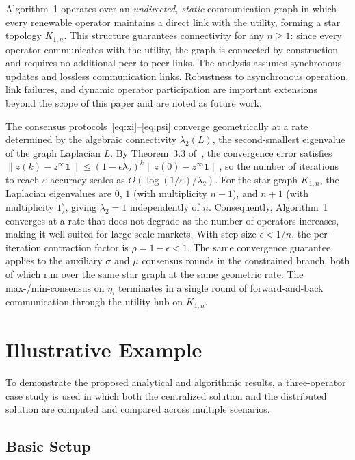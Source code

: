 \documentclass[conference]{IEEEtran}
\newcommand{\one}{\mathbf{1}}
\begin{document}
Algorithm~1 operates over an \emph{undirected, static} communication graph in which every renewable operator maintains a direct link with the utility, forming a star topology $K_{1,n}$. This structure guarantees connectivity for any $n \geq 1$: since every operator communicates with the utility, the graph is connected by construction and requires no additional peer-to-peer links. The analysis assumes synchronous updates and lossless communication links. Robustness to asynchronous operation, link failures, and dynamic operator participation are important extensions beyond the scope of this paper and are noted as future work.

The consensus protocols~\eqref{eq:xi}--\eqref{eq:psi} converge geometrically at a rate determined by the algebraic connectivity $\lambda_2(L)$, the second-smallest eigenvalue of the graph Laplacian $L$. By Theorem~3.3 of~\cite{qu}, the convergence error satisfies $\|z(k) - z^\infty\one\| \leq (1-\epsilon\lambda_2)^k \|z(0) - z^\infty\one\|$, so the number of iterations to reach $\varepsilon$-accuracy scales as $O\!\left(\log(1/\varepsilon)/\lambda_2\right)$. For the star graph $K_{1,n}$, the Laplacian eigenvalues are $0$, $1$ (with multiplicity $n-1$), and $n+1$ (with multiplicity $1$), giving $\lambda_2 = 1$ independently of $n$. Consequently, Algorithm~1 converges at a rate that does not degrade as the number of operators increases, making it well-suited for large-scale markets. With step size $\epsilon < 1/n$, the per-iteration contraction factor is $\rho = 1 - \epsilon < 1$. The same convergence guarantee applies to the auxiliary $\sigma$ and $\mu$ consensus rounds in the constrained branch, both of which run over the same star graph at the same geometric rate. The max-/min-consensus on $\eta_i$ terminates in a single round of forward-and-back communication through the utility hub on $K_{1,n}$.

\section{Illustrative Example \label{sec:examples}}

To demonstrate the proposed analytical and algorithmic results, a three-operator case study is used in which both the centralized solution and the distributed solution are computed and compared across multiple scenarios.

\subsection{Basic Setup}
\end{document}
